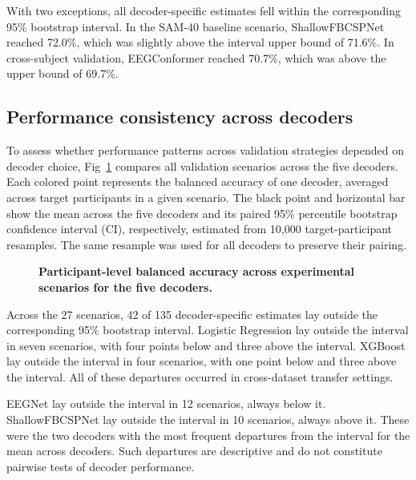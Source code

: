 \documentclass[10pt,letterpaper]{article}
\begin{document}
With two exceptions, all decoder-specific estimates fell within the
corresponding 95\% bootstrap interval. In the SAM-40 baseline scenario,
ShallowFBCSPNet reached 72.0\%, which was slightly above the interval upper
bound of 71.6\%. In cross-subject validation, EEGConformer reached 70.7\%,
which was above the upper bound of 69.7\%.

\subsection*{Performance consistency across decoders}

To assess whether performance patterns across validation strategies depended on
decoder choice, Fig~\ref{fig:scenario_accuracy_by_decoder} compares all
validation scenarios across the five decoders. Each colored point represents
the balanced accuracy of one decoder, averaged across target participants in a
given scenario. The black point and horizontal bar show the mean
across the five decoders and its paired 95\% percentile bootstrap confidence
interval (CI), respectively, estimated from 10,000 target-participant
resamples. The same resample was used for all decoders to preserve their
pairing.

\begin{figure}[H]
\centering
\caption{\textbf{Participant-level balanced accuracy across experimental scenarios for the five decoders.}}
\label{fig:scenario_accuracy_by_decoder}
\end{figure}

Across the 27 scenarios, 42 of 135 decoder-specific estimates lay outside the
corresponding 95\% bootstrap interval. Logistic Regression lay outside the
interval in seven scenarios, with four points below and three above the
interval. XGBoost lay outside the interval in four scenarios, with one point
below and three above the interval. All of these departures occurred in
cross-dataset transfer settings.

EEGNet lay outside the interval in 12 scenarios, always below it.
ShallowFBCSPNet lay outside the interval in 10 scenarios, always above it.
These were the two decoders with the most frequent departures from the
interval for the mean across decoders. Such departures are descriptive and
do not constitute pairwise tests of decoder performance.
\end{document}
